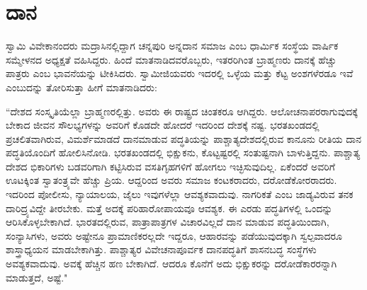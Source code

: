 
\chapter{ದಾನ}

ಸ್ವಾಮಿ ವಿವೇಕಾನಂದರು ಮದ್ರಾಸಿನಲ್ಲಿದ್ದಾಗ ಚನ್ನಪುರಿ ಅನ್ನದಾನ ಸಮಾಜ ಎಂಬ ಧಾರ್ಮಿಕ ಸಂಸ್ಥೆಯ ವಾರ್ಷಿಕ ಸಮ್ಮೇಳನದ ಅಧ್ಯಕ್ಷತೆ ವಹಿಸಿದ್ದರು. ಹಿಂದೆ ಮಾತನಾಡಿದವರೊಬ್ಬರು, ಇತರರಿಗಿಂತ ಬ್ರಾಹ್ಮಣರು ದಾನಕ್ಕೆ ಹೆಚ್ಚು ಪಾತ್ರರು ಎಂಬ ಭಾವನೆಯನ್ನು ಟೀಕಿಸಿದರು. ಸ್ವಾಮೀಜಿಯವರು ಇದರಲ್ಲಿ ಒಳ್ಳೆಯ ಮತ್ತು ಕೆಟ್ಟ ಅಂಶಗಳೆರಡೂ ಇವೆ ಎಂಬುದನ್ನು ತೋರಿಸುತ್ತಾ ಹೀಗೆ ಮಾತನಾಡಿದರು:

\vskip 0.2cm

“ದೇಶದ ಸಂಸ್ಕೃತಿಯೆಲ್ಲಾ ಬ್ರಾಹ್ಮಣರಲ್ಲಿತ್ತು. ಅವರು ಈ ರಾಷ್ಟ್ರದ ಚಿಂತಕರೂ ಆಗಿದ್ದರು. ಆಲೋಚನಾಪರರಾಗುವುದಕ್ಕೆ ಬೇಕಾದ ಜೀವನ ಸೌಲಭ್ಯಗಳನ್ನು ಅವರಿಗೆ ಕೊಡದೇ ಹೋದರೆ ಇದರಿಂದ ದೇಶಕ್ಕೆ ನಷ್ಟ. ಭರತಖಂಡದಲ್ಲಿ ಪ್ರಚಲಿತವಾಗಿರುವ, ವಿಮರ್ಶೆಮಾಡದೆ ದಾನಮಾಡುವ ಪದ್ಧತಿಯನ್ನು ಪಾಶ್ಚಾತ್ಯದೇಶದಲ್ಲಿರುವ ಕಾನೂನು ರೀತಿಯ ದಾನ ಪದ್ಧತಿಯೊಂದಿಗೆ ಹೋಲಿಸಿನೋಡಿ. ಭರತಖಂಡದಲ್ಲಿ ಭಿಕ್ಷುಕನು, ಕೊಟ್ಟಷ್ಟರಲ್ಲಿ ಸಂತುಷ್ಟನಾಗಿ ಬಾಳುತ್ತಿದ್ದನು. ಪಾಶ್ಚಾತ್ಯ ದೇಶದ ಭಿಕಾರಿಗಳು ಬಡವರಿಗಾಗಿ ಕಟ್ಟಿಸಿರುವ ವಸತಿಗೃಹಗಳಿಗೆ ಹೋಗಲು ಇಚ್ಛಿಸುವುದಿಲ್ಲ. ಏಕೆಂದರೆ ಅವರಿಗೆ ಊಟಕ್ಕಿಂತ ಸ್ವಾತಂತ್ರ್ಯವೇ ಹೆಚ್ಚು ಪ್ರಿಯ. ಆದ್ದರಿಂದ ಅವರು ಸಮಾಜ ಕಂಟಕರಾದರು, ದರೋಡೆಕೋರರಾದರು. ಇದರಿಂದ ಪೋಲೀಸು, ನ್ಯಾಯಾಲಯ, ಜೈಲು ಇವುಗಳೆಲ್ಲಾ ಆವಶ್ಯಕವಾದುವು. ನಾಗರಿಕತೆ ಎಂಬ ಜಾಡ್ಯವಿರುವ ತನಕ ದಾರಿದ್ರ್ಯವಿದ್ದೇ ತೀರಬೇಕು. ಮತ್ತೆ ಅದಕ್ಕೆ ಪರಿಹಾರೋಪಾಯವೂ ಆವಶ್ಯಕ. ಈ ಎರಡು ಪದ್ಧತಿಗಳಲ್ಲಿ ಒಂದನ್ನು ಆರಿಸಿಕೊಳ್ಳಬೇಕಾಗಿದೆ. ಭಾರತದಲ್ಲಿರುವ, ಪಾತ್ರಾಪಾತ್ರಗಳ ವಿಚಾರವಿಲ್ಲದೆ ದಾನ ಮಾಡುವ ಪದ್ಧತಿಯಿಂದಾಗಿ, ಸಂನ್ಯಾಸಿಗಳು, ಅವರು ಅಷ್ಟೇನೂ ಪ್ರಾಮಾಣಿಕರಲ್ಲದೇ ಇದ್ದರೂ, ಆಹಾರವನ್ನು ಪಡೆಯುವುದಕ್ಕಾಗಿ ಸ್ವಲ್ಪವಾದರೂ ಶಾಸ್ತ್ರಾಧ್ಯಯನ ಮಾಡಬೇಕಾಗಿತ್ತು. ಪಾಶ್ಚಾತ್ಯರ ವಿವೇಚನಾಪೂರ್ವಕ ದಾನಪದ್ಧತಿಗೆ ಶಾಸನಬದ್ಧ ಸಂಸ್ಥೆಗಳು ಅವಶ್ಯಕವಾದುವು. ಅವಕ್ಕೆ ಹೆಚ್ಚಿನ ಹಣ ಬೇಕಾಗಿದೆ. ಆದರೂ ಕೊನೆಗೆ ಅದು ಭಿಕ್ಷುಕರನ್ನು ದರೋಡೆಕಾರರನ್ನಾಗಿ ಮಾಡುತ್ತದೆ, ಅಷ್ಟೆ."


